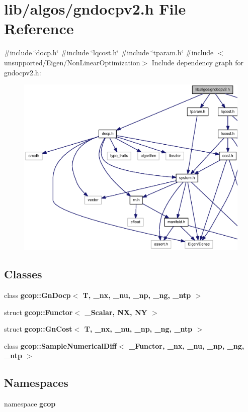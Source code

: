 \section{lib/algos/gndocpv2.h \-File \-Reference}
\label{gndocpv2_8h}
{\ttfamily \#include \char`\"{}docp.\-h\char`\"{}}\*
{\ttfamily \#include \char`\"{}lqcost.\-h\char`\"{}}\*
{\ttfamily \#include \char`\"{}tparam.\-h\char`\"{}}\*
{\ttfamily \#include $<$unsupported/\-Eigen/\-Non\-Linear\-Optimization$>$}\*
\-Include dependency graph for gndocpv2.\-h\-:\nopagebreak
\begin{figure}[H]
\begin{center}
\leavevmode
\includegraphics[width=350pt]{gndocpv2_8h__incl}
\end{center}
\end{figure}
\subsection*{\-Classes}
\begin{DoxyCompactItemize}
\item 
class {\bf gcop\-::\-Gn\-Docp$<$ T, \-\_\-nx, \-\_\-nu, \-\_\-np, \-\_\-ng, \-\_\-ntp $>$}
\item 
struct {\bf gcop\-::\-Functor$<$ \-\_\-\-Scalar, N\-X, N\-Y $>$}
\item 
struct {\bf gcop\-::\-Gn\-Cost$<$ T, \-\_\-nx, \-\_\-nu, \-\_\-np, \-\_\-ng, \-\_\-ntp $>$}
\item 
class {\bf gcop\-::\-Sample\-Numerical\-Diff$<$ \-\_\-\-Functor, \-\_\-nx, \-\_\-nu, \-\_\-np, \-\_\-ng, \-\_\-ntp $>$}
\end{DoxyCompactItemize}
\subsection*{\-Namespaces}
\begin{DoxyCompactItemize}
\item 
namespace {\bf gcop}
\end{DoxyCompactItemize}
